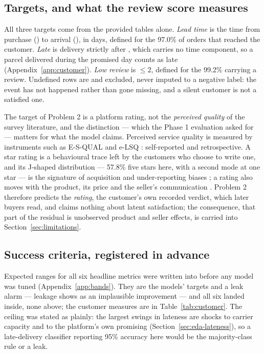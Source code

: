 \subsection{Targets, and what the review score measures}

All three targets come from the provided tables alone. \emph{Lead time} is the
time from purchase () to arrival
(), in days, defined for the
97.0\% of orders that reached the customer. \emph{Late} is delivery strictly after
, which carries no time component, so a
parcel delivered during the promised day counts as late
(Appendix~\ref{app:customer}). \emph{Low review} is 
$\le 2$, defined for the 99.2\% carrying a review. Undefined rows are 
and excluded, never imputed to a negative label: the event has not happened
rather than gone missing, and a silent customer is not a satisfied one.

The target of Problem 2 is a platform rating, not the \emph{perceived quality}
of the survey literature, and the distinction --- which the Phase 1 evaluation
asked for --- matters for what the model claims. Perceived service quality is
measured by instruments such as E-S-QUAL \citep{parasuraman2005esqual} and
e-LSQ \citep{rao2011elsq}: self-reported and retrospective. A star rating is a
behavioural trace left by the customers who choose to write one, and its
J-shaped distribution --- 57.8\% five stars here, with a second mode at one
star --- is the signature of acquisition and under-reporting biases
\citep{hu2009jshaped, hu2017selfselection}; a rating also moves with the
product, its price and the seller's communication
\citep{dellarocas2003digitization}. Problem 2 therefore predicts the
\emph{rating}, the customer's own recorded verdict, which later buyers read, and
claims nothing about latent satisfaction; the consequence, that part of the
residual is unobserved product and seller effects, is carried into
Section~\ref{sec:limitations}.

\subsection{Success criteria, registered in advance}
\label{sec:bands}

Expected ranges for all six headline metrics were written into
 before any model was tuned (Appendix~\ref{app:bands}).
They are the models' targets and a leak alarm --- leakage shows as an implausible
improvement --- and all six landed inside, none above; the customer measures are
in Table~\ref{tab:customer}. The ceiling was stated as plainly: the largest swings in
lateness are shocks to carrier capacity and to the platform's own promising
(Section~\ref{sec:eda-lateness}), so a late-delivery classifier reporting 95\%
accuracy here would be the majority-class rule or a leak.
